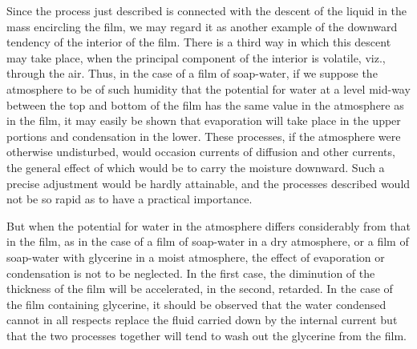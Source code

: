 \documentclass[12pt]{memoir}
\begin{document}
Since the process just described is connected with the descent of the liquid in the mass encircling the film, we may regard it as another example of the downward tendency of the interior of the film. There is a third way in which this descent may take place, when the principal component of the interior is volatile, viz., through the air. Thus, in the case of a film of soap-water, if we suppose the atmosphere to be of such humidity that the potential for water at a level mid-way between the top and bottom of the film has the same value in the atmosphere as in the film, it may easily be shown that evaporation will take place in the upper portions and condensation in the lower. These processes, if the atmosphere were otherwise undisturbed, would occasion currents of diffusion and other currents, the general effect of which would be to carry the moisture downward. Such a precise adjustment would be hardly attainable, and the processes described would not be so rapid as to have a practical importance.

But when the potential for water in the atmosphere differs considerably from that in the film, as in the case of a film of soap-water in a dry atmosphere, or a film of soap-water with glycerine in a moist atmosphere, the effect of evaporation or condensation is not to be neglected. In the first case, the diminution of the thickness of the film will be accelerated, in the second, retarded. In the case of the film containing glycerine, it should be observed that the water condensed cannot in all respects replace the fluid carried down by the internal current but that the two processes together will tend to wash out the glycerine from the film.
\end{document}
